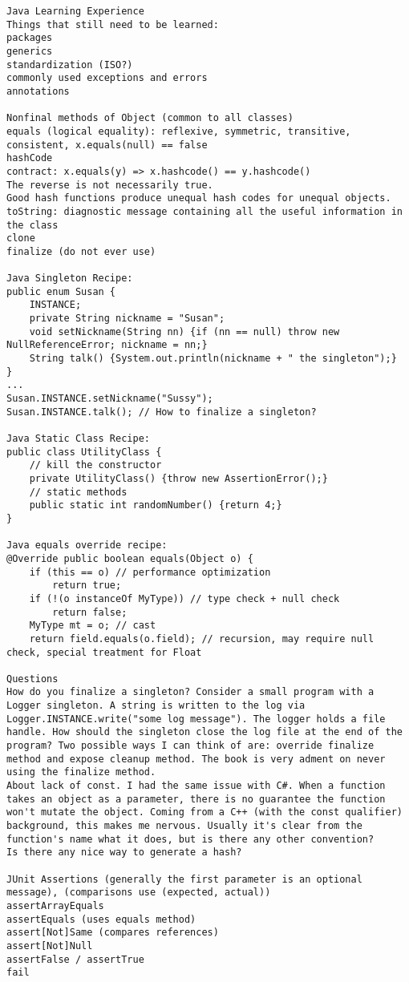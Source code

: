 \documentclass[twocolumn]{article}
\begin{document}
\begin{lstlisting}
Java Learning Experience
Things that still need to be learned:
packages
generics
standardization (ISO?)
commonly used exceptions and errors
annotations

Nonfinal methods of Object (common to all classes)
equals (logical equality): reflexive, symmetric, transitive, consistent, x.equals(null) == false
hashCode
contract: x.equals(y) => x.hashcode() == y.hashcode()
The reverse is not necessarily true.
Good hash functions produce unequal hash codes for unequal objects.
toString: diagnostic message containing all the useful information in the class
clone
finalize (do not ever use)

Java Singleton Recipe:
public enum Susan {
	INSTANCE;
	private String nickname = "Susan";
	void setNickname(String nn) {if (nn == null) throw new NullReferenceError; nickname = nn;}
	String talk() {System.out.println(nickname + " the singleton");}
}
...
Susan.INSTANCE.setNickname("Sussy");
Susan.INSTANCE.talk(); // How to finalize a singleton?

Java Static Class Recipe:
public class UtilityClass {
	// kill the constructor
	private UtilityClass() {throw new AssertionError();}
	// static methods
	public static int randomNumber() {return 4;}
}

Java equals override recipe:
@Override public boolean equals(Object o) {
	if (this == o) // performance optimization
		return true;
	if (!(o instanceOf MyType)) // type check + null check
		return false;
	MyType mt = o; // cast
	return field.equals(o.field); // recursion, may require null check, special treatment for Float

Questions
How do you finalize a singleton? Consider a small program with a Logger singleton. A string is written to the log via Logger.INSTANCE.write("some log message"). The logger holds a file handle. How should the singleton close the log file at the end of the program? Two possible ways I can think of are: override finalize method and expose cleanup method. The book is very adment on never using the finalize method.
About lack of const. I had the same issue with C#. When a function takes an object as a parameter, there is no guarantee the function won't mutate the object. Coming from a C++ (with the const qualifier) background, this makes me nervous. Usually it's clear from the function's name what it does, but is there any other convention?
Is there any nice way to generate a hash?

JUnit Assertions (generally the first parameter is an optional message), (comparisons use (expected, actual))
assertArrayEquals
assertEquals (uses equals method)
assert[Not]Same (compares references)
assert[Not]Null
assertFalse / assertTrue
fail
\end{lstlisting}
\end{document}
